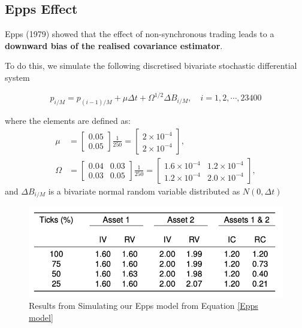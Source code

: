 \documentclass[11pt]{article}
\begin{document}
\subsection{Epps Effect}

Epps (1979) showed that the effect of non-synchronous trading leads to a \textbf{downward bias of the realised covariance estimator}.

To do this, we simulate the following discretised bivariate stochastic differential system

\begin{equation}
\label{Epps model}
p_{i / M}=p_{(i-1) / M}+\mu \Delta t+\Omega^{1 / 2} \Delta B_{i / M}, \quad i=1,2, \cdots, 23400
\end{equation}

where the elements are defined as:
\begin{equation}
\begin{aligned}
\mu & =\left[\begin{array}{l}
0.05 \\
0.05
\end{array}\right] \frac{1}{250}=\left[\begin{array}{l}
2 \times 10^{-4} \\
2 \times 10^{-4}
\end{array}\right], \\
\Omega & =\left[\begin{array}{ll}
0.04 & 0.03 \\
0.03 & 0.05
\end{array}\right] \frac{1}{250}=\left[\begin{array}{ll}
1.6 \times 10^{-4} & 1.2 \times 10^{-4} \\
1.2 \times 10^{-4} & 2.0 \times 10^{-4}
\end{array}\right],
\end{aligned}
\end{equation}
and $\Delta B_{i/M}$ is a bivariate normal random variable distributed as $N(0,\Delta t)$

\begin{figure}[h]
    \centering
    \includegraphics{pics/simulated Epps.png}
    \caption{Results from Simulating our Epps model from Equation \eqref{Epps model}}
    \label{fig:epps results}
\end{figure}
\end{document}
